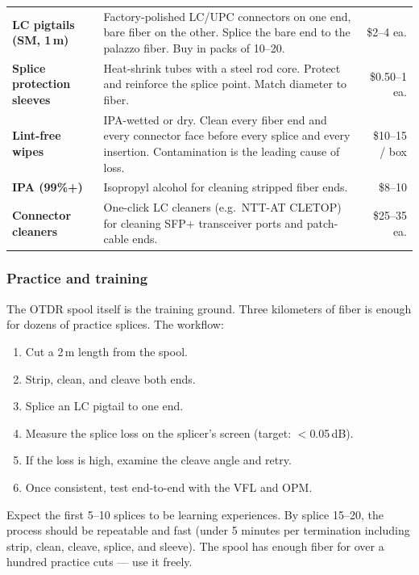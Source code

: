 \documentclass[10pt, letterpaper]{article}
\begin{document}
\begin{metricbox}
\begin{tabularx}{\textwidth}{@{} >{\bfseries}p{3.8cm} X r @{}}
LC pigtails (SM, 1\,m) & Factory-polished LC/UPC connectors on one end, bare fiber on the other. Splice the bare end to the palazzo fiber. Buy in packs of 10--20. & \$2--4 ea. \\
Splice protection sleeves & Heat-shrink tubes with a steel rod core. Protect and reinforce the splice point. Match diameter to fiber. & \$0.50--1 ea. \\
Lint-free wipes & IPA-wetted or dry. Clean every fiber end and every connector face before every splice and every insertion. Contamination is the leading cause of loss. & \$10--15 / box \\
IPA (99\%+) & Isopropyl alcohol for cleaning stripped fiber ends. & \$8--10 \\
Connector cleaners & One-click LC cleaners (e.g.\ NTT-AT CLETOP) for cleaning SFP+ transceiver ports and patch-cable ends. & \$25--35 ea. \\
\end{tabularx}
\end{metricbox}

\subsubsection*{Practice and training}

The OTDR spool itself is the training ground. Three kilometers of fiber is enough for dozens of practice splices. The workflow:

\begin{enumerate}
  \item Cut a 2\,m length from the spool.
  \item Strip, clean, and cleave both ends.
  \item Splice an LC pigtail to one end.
  \item Measure the splice loss on the splicer's screen (target: $<$0.05\,dB).
  \item If the loss is high, examine the cleave angle and retry.
  \item Once consistent, test end-to-end with the VFL and OPM.
\end{enumerate}

Expect the first 5--10 splices to be learning experiences. By splice 15--20, the process should be repeatable and fast (under 5 minutes per termination including strip, clean, cleave, splice, and sleeve). The spool has enough fiber for over a hundred practice cuts --- use it freely.
\end{document}
